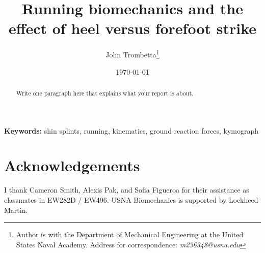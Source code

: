 \documentclass[10pt]{article}
\title{Running biomechanics and the effect of heel versus forefoot strike}
\author{John Trombetta\thanks{Author is with the Department of Mechanical Engineering at the United States Naval Academy. Address for correspondence: \emph{m236348@usna.edu}}}
\date{\today}
\begin{document}
\maketitle
\begin{abstract}
Write one paragraph here that explains what your report is about.
\end{abstract}
{\scriptsize\textbf{Keywords: }shin splints, running, kinematics, ground reaction forces, kymograph}


\section{Acknowledgements}
I thank Cameron Smith, Alexis Pak, and Sofia Figueroa for their assistance as classmates in EW282D / EW496. USNA Biomechanics is supported by Lockheed Martin. 



%
\end{document}
